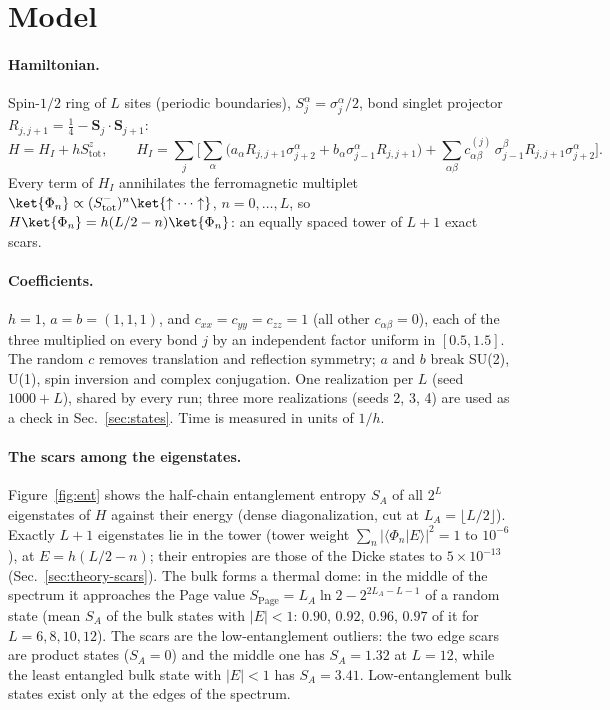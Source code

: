\section{Model}
\label{sec:model}

\paragraph{Hamiltonian.} Spin-$1/2$ ring of $L$ sites (periodic boundaries), $S^\alpha_j = \sigma^\alpha_j/2$, bond singlet projector $R_{j,j+1} = \tfrac14 - \mathbf S_j\cdot\mathbf S_{j+1}$:
\begin{equation}
H = H_I + h S^z_{\mathrm{tot}}, \qquad
H_I = \sum_j \Big[ \sum_\alpha \big( a_\alpha R_{j,j+1}\sigma^\alpha_{j+2} + b_\alpha \sigma^\alpha_{j-1}R_{j,j+1} \big)
+ \sum_{\alpha\beta} c^{(j)}_{\alpha\beta}\, \sigma^\beta_{j-1} R_{j,j+1} \sigma^\alpha_{j+2} \Big].
\end{equation}
Every term of $H_I$ annihilates the ferromagnetic multiplet $\ket{\Phi_n} \propto (S^-_{\mathrm{tot}})^n\ket{\uparrow\cdots\uparrow}$, $n = 0,\dots,L$, so $H\ket{\Phi_n} = h(L/2-n)\ket{\Phi_n}$: an equally spaced tower of $L+1$ exact scars.

\paragraph{Coefficients.} $h = 1$, $a = b = (1, 1, 1)$, and $c_{xx} = c_{yy} = c_{zz} = 1$ (all other $c_{\alpha\beta} = 0$), each of the three multiplied on every bond $j$ by an independent factor uniform in $[0.5, 1.5]$. The random $c$ removes translation and reflection symmetry; $a$ and $b$ break SU(2), U(1), spin inversion and complex conjugation. One realization per $L$ (seed $1000 + L$), shared by every run; three more realizations (seeds 2, 3, 4) are used as a check in Sec.~\ref{sec:states}. Time is measured in units of $1/h$.

\paragraph{The scars among the eigenstates.} Figure~\ref{fig:ent} shows the half-chain entanglement entropy $S_A$ of all $2^L$ eigenstates of $H$ against their energy (dense diagonalization, cut at $L_A = \lfloor L/2\rfloor$). Exactly $L + 1$ eigenstates lie in the tower (tower weight $\sum_n\lvert\langle\Phi_n\vert E\rangle\rvert^2 = 1$ to $10^{-6}$), at $E = h(L/2 - n)$; their entropies are those of the Dicke states to $5\times10^{-13}$ (Sec.~\ref{sec:theory-scars}). The bulk forms a thermal dome: in the middle of the spectrum it approaches the Page value $S_{\mathrm{Page}} = L_A\ln2 - 2^{2L_A - L - 1}$ of a random state (mean $S_A$ of the bulk states with $\lvert E\rvert < 1$: $0.90$, $0.92$, $0.96$, $0.97$ of it for $L = 6, 8, 10, 12$). The scars are the low-entanglement outliers: the two edge scars are product states ($S_A = 0$) and the middle one has $S_A = 1.32$ at $L = 12$, while the least entangled bulk state with $\lvert E\rvert < 1$ has $S_A = 3.41$. Low-entanglement bulk states exist only at the edges of the spectrum.

